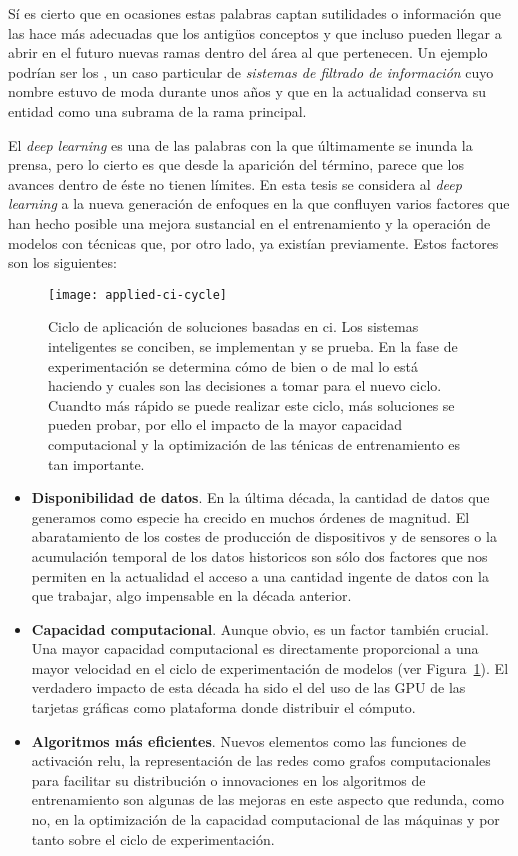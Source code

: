 Sí es cierto que en ocasiones estas palabras captan sutilidades o información que las hace más adecuadas que los antigüos conceptos y que incluso pueden llegar a abrir en el futuro nuevas ramas dentro del área al que pertenecen. Un ejemplo podrían ser los , un caso particular de \textit{sistemas de filtrado de información} cuyo nombre estuvo de moda durante unos años y que en la actualidad conserva su entidad como una subrama de la rama principal.

El \textit{deep learning} es una de las palabras con la que últimamente se inunda la prensa, pero lo cierto es que desde la aparición del término, parece que los avances dentro de éste no tienen límites. En esta tesis se considera al \textit{deep learning} a la nueva generación de enfoques en la que confluyen varios factores que han hecho posible una mejora sustancial en el entrenamiento y la operación de modelos con técnicas que, por otro lado, ya existían previamente. Estos factores son los siguientes:

\begin{figure}[t]
	\centering
	\texttt{[image: applied-ci-cycle]}
	\caption[Ciclo de aplicación de soluciones basadas en ]{Ciclo de aplicación de soluciones basadas en \acrlong{ci}. Los sistemas inteligentes se conciben, se implementan y se prueba. En la fase de experimentación se determina cómo de bien o de mal lo está haciendo y cuales son las decisiones a tomar para el nuevo ciclo. Cuandto más rápido se puede realizar este ciclo, más soluciones se pueden probar, por ello el impacto de la mayor capacidad computacional y la optimización de las ténicas de entrenamiento es tan importante.}
	\label{fig:applied-ci-cycle}
\end{figure}

\begin{itemize}
	\item \textbf{Disponibilidad de datos}. En la última década, la cantidad de datos que generamos como especie ha crecido en muchos órdenes de magnitud. El abaratamiento de los costes de producción de dispositivos y de sensores o la acumulación temporal de los datos historicos son sólo dos factores que nos permiten en la actualidad el acceso a una cantidad ingente de datos con la que trabajar, algo impensable en la década anterior.
	\item \textbf{Capacidad computacional}. Aunque obvio, es un factor también crucial. Una mayor capacidad computacional es directamente proporcional a una mayor velocidad en el ciclo de experimentación de modelos (ver Figura~\ref{fig:applied-ci-cycle}). El verdadero impacto de esta década ha sido el del uso de las GPU de las tarjetas gráficas como plataforma donde distribuir el cómputo.
	\item \textbf{Algoritmos más eficientes}. Nuevos elementos como las funciones de activación \gls{relu}, la representación de las redes como grafos computacionales para facilitar su distribución o innovaciones en los algoritmos de entrenamiento son algunas de las mejoras en este aspecto que redunda, como no, en la optimización de la capacidad computacional de las máquinas y por tanto sobre el ciclo de experimentación.
\end{itemize}

